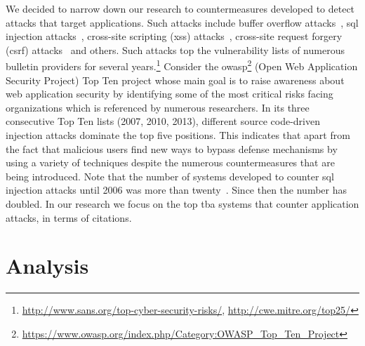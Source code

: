 \documentclass[conference]{IEEEtran}
\begin{document}
We decided to narrow down our
research to countermeasures developed to
detect attacks that target applications. Such attacks include
buffer overflow attacks~\cite{K11}, {\sc sql} injection
attacks~\cite{RL12b}, cross-site scripting ({\sc xss})
attacks~\cite{SG07}, cross-site request forgery ({\sc csrf})
attacks~\cite{LZRL09} and others.
Such attacks top the vulnerability lists of numerous bulletin providers for several
years.\footnote{\url{http://www.sans.org/top-cyber-security-risks/}, \url{http://cwe.mitre.org/top25/}}
Consider the {\sc owasp}\footnote{\url{https://www.owasp.org/index.php/Category:OWASP_Top_Ten_Project}}
(Open Web Application Security Project)
Top Ten project whose main goal is to raise awareness about
web application security by identifying some of the most critical risks facing
organizations which is referenced by numerous researchers.
In its three consecutive Top Ten lists (2007, 2010, 2013), different
source code-driven injection attacks dominate the top five positions.
This indicates that
apart from the fact that malicious users find new ways to bypass
defense mechanisms by using a variety of techniques despite the numerous
countermeasures that are being introduced.
Note that the number of systems developed to counter {\sc sql}
injection attacks until 2006 was more than twenty~\cite{HVO06}.
Since then the number has doubled.
In our research we focus on the top {\sc tba} systems that counter
application attacks, in terms of citations.

\section{Analysis}
\end{document}

